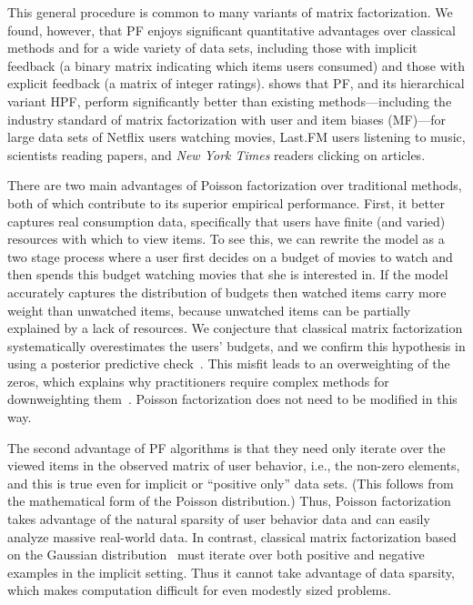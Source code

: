 
This general procedure is common to many variants of matrix factorization.
We found,
however, that PF enjoys significant quantitative advantages over
classical methods and for a wide variety of data sets, including those
with implicit feedback (a binary matrix indicating which items users
consumed) and those with explicit feedback (a matrix of integer
ratings).   shows that PF, and its
hierarchical variant HPF, perform significantly better than
existing methods---including the industry standard of matrix
factorization with user and item biases (MF)---for large data sets of
Netflix users watching movies, Last.FM users listening to music,
scientists reading papers, and \textit{New York Times} readers
clicking on articles.


There are two main advantages of Poisson factorization over
traditional methods, both of which contribute to its superior
empirical performance.  First, it better captures real consumption
data, specifically that users have finite (and varied) resources with
which to view items.  To see this, we can rewrite the model as a two
stage process where a user first decides on a budget of movies to
watch and then spends this budget watching movies that she is
interested in.  If the model accurately captures the distribution of
budgets then watched items carry more weight than unwatched items,
because unwatched items can be partially explained by a lack of
resources. We conjecture that classical matrix factorization
systematically overestimates the users' budgets, and we confirm this
hypothesis in  using a posterior predictive
check~\cite{Gelman:1996}.  This misfit leads to an overweighting of
the zeros, which explains why practitioners require complex methods
for downweighting
them~\cite{Hu:2008p9402,Gantner:2012p9364,Dror:2012a,Paquet:2013p9197}.
Poisson factorization does not need to be modified in this way.


The second advantage of PF algorithms is that they need only iterate over the
viewed items in the observed matrix of user behavior, i.e., the non-zero
elements, and this is true even for implicit or ``positive only'' data sets.
(This follows from the mathematical form of the Poisson distribution.)  Thus,
Poisson factorization takes advantage of the natural sparsity of user behavior
data and can easily analyze massive real-world data. In contrast, classical
matrix factorization based on the Gaussian
distribution~\cite{Salakhutdinov:2008} must iterate over both positive and
negative examples in the implicit setting. Thus it cannot take advantage of
data sparsity, which makes computation difficult for even modestly sized
problems.

